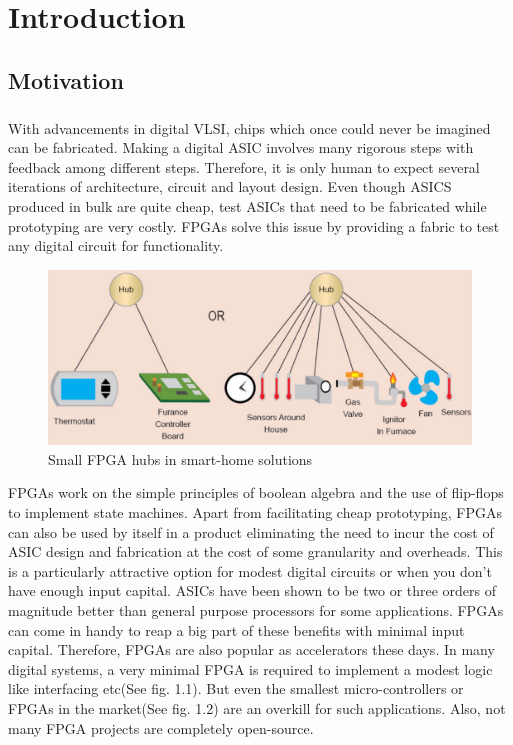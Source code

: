 %
%
\let\textcircled=\pgftextcircled
\chapter{Introduction}
\label{chap:intro}
\vspace{-0.2 cm}

\section{Motivation}

\paragraph{}

With advancements in digital VLSI, chips which once could never be imagined can be fabricated. Making a digital ASIC involves many rigorous steps with feedback among different steps. Therefore, it is only human to expect several iterations of architecture, circuit and layout design. Even though ASICS produced in bulk are quite cheap, test ASICs that need to be fabricated while prototyping are very costly. FPGAs solve this issue by providing a fabric to test any digital circuit for functionality. 

\begin{figure}[h]
\centering
\includegraphics[width=0.9\linewidth]{FPGA_application_in_IOT_and_smart_solutions.png} 
\caption{Small FPGA hubs in smart-home solutions}
\label{fig:Figure}
\end{figure}

FPGAs work on the simple principles of boolean algebra and the use of flip-flops to implement state machines. Apart from facilitating cheap prototyping, FPGAs can also be used by itself in a product eliminating the need to incur the cost of ASIC design and fabrication at the cost of some granularity and overheads. This is a particularly attractive option for modest digital circuits or when you don't have enough input capital. ASICs have been shown to be two or three orders of magnitude better than general purpose processors for some applications. FPGAs can come in handy to reap a big part of these benefits with minimal input capital. Therefore, FPGAs are also popular as accelerators these days. In many digital systems, a very minimal FPGA is required to implement a modest logic like interfacing etc(See fig. 1.1). But even the smallest micro-controllers or FPGAs in the market(See fig. 1.2) are an overkill for such applications. Also, not many FPGA projects are completely open-source.

